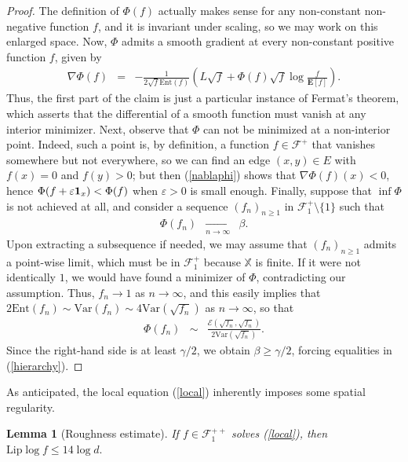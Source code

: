 \documentclass[12pt,final]{article}
\newtheorem{lemma}{Lemma}[section]
\numberwithin{equation}{section}
\newcommand{\Lip}{\mathrm {Lip}}
\newcommand{\bE}{{\mathbf{E}}}
\newcommand{\Ent}{\mathrm{Ent}}
\newcommand{\Var}{\mathrm{Var}}
\newcommand{\cE}{\mathscr {E}}
\newcommand{\cF}{\mathcal {F}}
\newcommand{\dX}{\mathbb{X}}
\begin{document}
\begin{proof}
The definition of $\Phi(f)$ actually makes sense for any non-constant non-negative function $f$, and it is invariant under scaling, so we may work on this enlarged space. Now, $\Phi$ admits a smooth gradient at every  non-constant positive function $f$, given by 
\begin{eqnarray}
\label{nablaphi}
\nabla\Phi(f) & = & -\frac{1}{2\sqrt{f}\Ent(f)}\left(L\sqrt{f}+\Phi(f)\sqrt{f}\log \frac{f}{\bE[f]}\right).
\end{eqnarray}
Thus, the first part of the claim is just a particular instance of Fermat's theorem, which asserts that the differential of a smooth function must vanish at any interior minimizer. Next, observe that $\Phi$ can not be minimized at a non-interior point. Indeed, such a point is, by definition, a function $f\in\cF^+$ that vanishes somewhere but not everywhere, so we can find an edge  $(x,y)\in E$ with $f(x)=0$ and $f(y)>0$; but then  (\ref{nablaphi}) shows that $\nabla\Phi(f)(x)<0$, hence  $\Phi(f+\varepsilon{\bf 1}_x)<\Phi(f)$ when $\varepsilon>0$ is small enough. Finally, suppose that $\inf\Phi$ is not achieved at all, and consider a sequence $(f_n)_{n\ge 1}$ in $\cF^+_1\setminus\{1\}$ such that
\begin{eqnarray*}
\Phi(f_n) & \xrightarrow[n\to\infty]{} & \beta.
\end{eqnarray*} 
Upon extracting a subsequence if needed, we may assume that $(f_n)_{n\ge 1}$ admits a point-wise limit, which must be in $\cF_1^+$ because $\dX$ is finite. If it were not identically $1$, we would have found a minimizer of $\Phi$, contradicting our assumption. Thus, $f_n\to 1$ as $n\to\infty$, and this easily implies that $2\Ent(f_n) \sim \Var(f_n) \sim  4\Var(\sqrt{f_n})$ as $n\to\infty$, so that 
\begin{eqnarray*}
\Phi(f_n) & \sim & \frac{\cE(\sqrt{f_n},\sqrt{f_n})}{2\Var(\sqrt{f_n})}.
\end{eqnarray*}
Since the right-hand side is at least $\gamma/2$, we obtain $\beta\ge\gamma/2$, forcing equalities in (\ref{hierarchy}).
\end{proof}
As anticipated, the local equation (\ref{local}) inherently imposes some spatial regularity. 
\begin{lemma}[Roughness estimate]\label{lm:regularity}If $f\in\cF^{++}_1$ solves (\ref{local}), then 
$
\Lip \log f  \le  14\log d.
$
\end{lemma}
\end{document}
